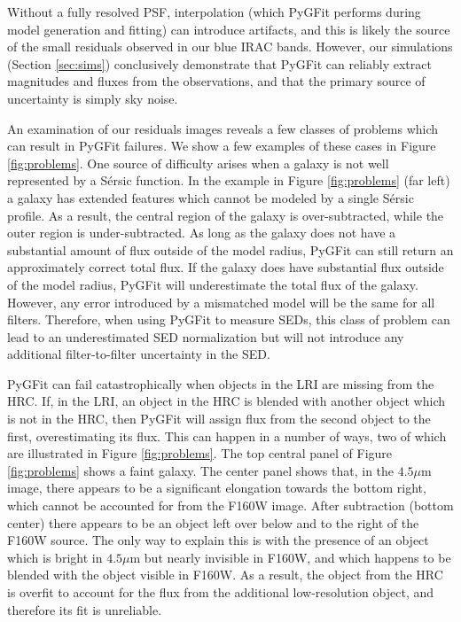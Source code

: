 \documentclass[apj]{emulateapj}
\newcommand{\sersic}{S\'{e}rsic}
\newcommand{\pygfit}{PyGFit}
\begin{document}
Without a fully resolved PSF, interpolation (which \pygfit{} performs during model generation and fitting) can introduce artifacts, and this is likely the source of the small residuals observed in our blue IRAC bands.  However, our simulations (Section \ref{sec:sims}) conclusively demonstrate that \pygfit{} can reliably extract magnitudes and fluxes from the observations, and that the primary source of uncertainty is simply sky noise.

An examination of our residuals images reveals a few classes of problems which can result in \pygfit{} failures.  We show a few examples of these cases in Figure \ref{fig:problems}.  One source of difficulty arises when a galaxy is not well represented by a \sersic{} function.  In the example in Figure \ref{fig:problems} (far left) a galaxy has extended features which cannot be modeled by a single \sersic{} profile.  As a result, the central region of the galaxy is over-subtracted, while the outer region is under-subtracted.  As long as the galaxy does not have a substantial amount of flux outside of the model radius, \pygfit{} can still return an approximately correct total flux.  If the galaxy does have substantial flux outside of the model radius, \pygfit{} will underestimate the total flux of the galaxy.  However, any error introduced by a mismatched model will be the same for all filters.  Therefore, when using \pygfit{} to measure SEDs, this class of problem can lead to an underestimated SED normalization but will not introduce any additional filter-to-filter uncertainty in the SED.

\pygfit{} can fail catastrophically when objects in the LRI are missing from the HRC.  If, in the LRI, an object in the HRC is blended with another object which is not in the HRC, then \pygfit{} will assign flux from the second object to the first, overestimating its flux.  This can happen in a number of ways, two of which are illustrated in Figure \ref{fig:problems}.  The top central panel of Figure \ref{fig:problems} shows a faint galaxy.  The center panel shows that, in the $4.5\mu$m image, there appears to be a significant elongation towards the bottom right, which cannot be accounted for from the F160W image.  After subtraction (bottom center) there appears to be an object left over below and to the right of the F160W source.  The only way to explain this is with the presence of an object which is bright in $4.5\mu$m but nearly invisible in F160W, and which happens to be blended with the object visible in F160W.  As a result, the object from the HRC is overfit to account for the flux from the additional low-resolution object, and therefore its fit is unreliable.
\end{document}
